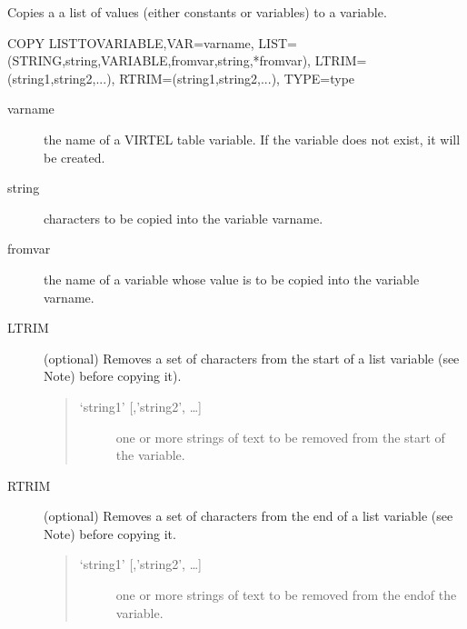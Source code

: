 \documentclass[letterpaper,10pt,english]{sphinxmanual}
\begin{document}

Copies a a list of values (either constants or variables) to a variable.

\begin{sphinxVerbatim}[commandchars=\\\{\}]
COPY\PYGZdl{} LIST\PYGZhy{}TO\PYGZhy{}VARIABLE,VAR=\PYGZsq{}varname\PYGZsq{},
    LIST=(STRING,\PYGZsq{}string\PYGZsq{},VARIABLE,\PYGZsq{}fromvar\PYGZsq{},\PYGZsq{}string\PYGZsq{},\PYGZsq{}*fromvar\PYGZsq{}),
    LTRIM=(\PYGZsq{}string1\PYGZsq{},\PYGZsq{}string2\PYGZsq{},...),
    RTRIM=(\PYGZsq{}string1\PYGZsq{},\PYGZsq{}string2\PYGZsq{},...),
    TYPE=type
\end{sphinxVerbatim}
\begin{description}
\item[{varname}] \leavevmode
the name of a VIRTEL table variable. If the variable does not exist, it will be created.

\item[{string}] \leavevmode
characters to be copied into the variable varname.

\item[{fromvar}] \leavevmode
the name of a variable whose value is to be copied into the variable varname.

\item[{LTRIM}] \leavevmode
(optional) Removes a set of characters from the start of a list variable (see Note) before copying it).
\begin{quote}
\begin{description}
\item[{‘string1’ {[},’string2’, …{]}}] \leavevmode
one or more strings of text to be removed from the start of the variable.

\end{description}
\end{quote}

\item[{RTRIM}] \leavevmode
(optional) Removes a set of characters from the end of a list variable (see Note) before copying it.
\begin{quote}
\begin{description}
\item[{‘string1’ {[},’string2’, …{]}}] \leavevmode
one or more strings of text to be removed from the endof the variable.

\end{description}
\end{quote}


\end{description}
\end{document}

